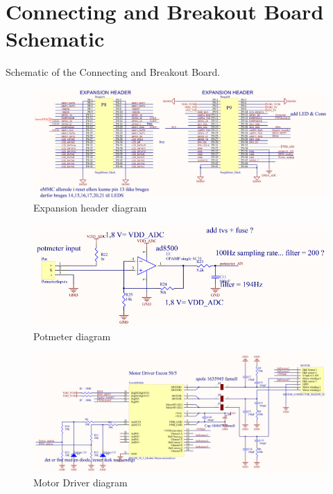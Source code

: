 \chapter{Connecting and Breakout Board Schematic}\label{app:ConnectingBreakoutBoard} 

Schematic of the Connecting and Breakout Board.

\begin{figure}[H]
  \centering
	\includegraphics[scale=0.92]{figures/ExpanionHeader.pdf}
	\caption{Expansion header diagram}
	\label{labExpanionHeader}
\end{figure}\vspace{-5mm}


\begin{figure}[H]
	\centering
	\includegraphics[scale=0.92]{figures/Potmeter.pdf}
	\caption{Potmeter diagram}
	\label{labPotmeter}
\end{figure}\vspace{-5mm}


\begin{figure}[H]
	\centering
	\includegraphics[scale=0.92]{figures/MotorDriver.pdf}
	\caption{Motor Driver diagram}
	\label{labMotorDriver}
\end{figure}\vspace{-5mm}


